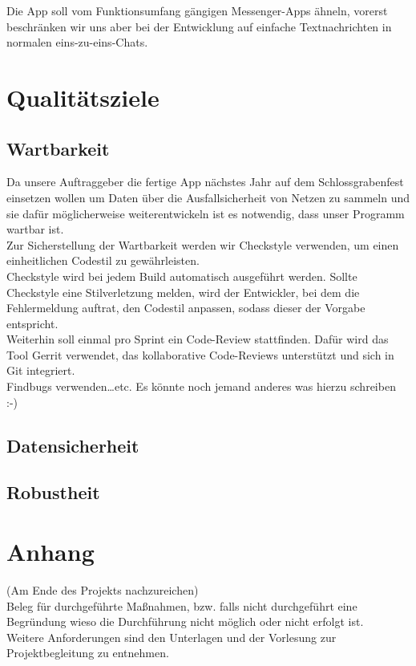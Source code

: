 \documentclass[accentcolor=tud0b,12pt,paper=a4]{tudreport}
\begin{document}
		Die App soll vom Funktionsumfang gängigen Messenger-Apps ähneln, vorerst beschränken wir uns aber bei der Entwicklung auf einfache Textnachrichten in normalen eins-zu-eins-Chats.\\


	\chapter{Qualitätsziele}
        \section{Wartbarkeit}
    
		Da unsere Auftraggeber die fertige App nächstes Jahr auf dem Schlossgrabenfest einsetzen wollen um Daten über die Ausfallsicherheit von Netzen zu sammeln und sie dafür möglicherweise weiterentwickeln ist es notwendig, dass unser Programm wartbar ist.\\

		Zur Sicherstellung der Wartbarkeit werden wir Checkstyle verwenden, um einen einheitlichen Codestil zu gewährleisten.\\
                Checkstyle wird bei jedem Build automatisch ausgeführt werden. Sollte Checkstyle eine Stilverletzung melden, wird der Entwickler, bei dem die Fehlermeldung auftrat, den Codestil anpassen, sodass dieser der Vorgabe entspricht.\\

                Weiterhin soll einmal pro Sprint ein Code-Review stattfinden. Dafür wird das Tool Gerrit verwendet, das kollaborative Code-Reviews unterstützt und sich in Git integriert.\\

                Findbugs verwenden\ldots etc. Es könnte noch jemand anderes was hierzu schreiben :-)
                
                

        \section{Datensicherheit}
        
        \section{Robustheit}
        
\appendix	
	\chapter{Anhang}
		(Am Ende des Projekts nachzureichen)\\
		Beleg für durchgeführte Maßnahmen, bzw. falls nicht durchgeführt eine Begründung wieso die Durchführung nicht möglich oder nicht erfolgt ist. \\
		Weitere Anforderungen sind den Unterlagen und der Vorlesung zur Projektbegleitung zu entnehmen.
	
\end{document}
